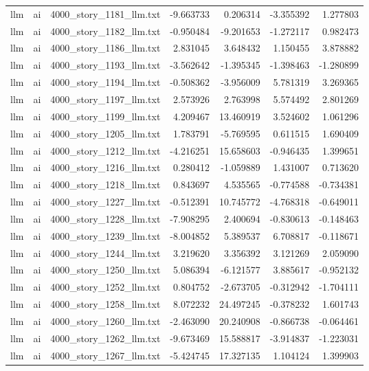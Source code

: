 \begin{longtable}{lllrrrr}
llm & ai & 4000\_story\_1181\_llm.txt & -9.663733 & 0.206314 & -3.355392 & 1.277803 \\
llm & ai & 4000\_story\_1182\_llm.txt & -0.950484 & -9.201653 & -1.272117 & 0.982473 \\
llm & ai & 4000\_story\_1186\_llm.txt & 2.831045 & 3.648432 & 1.150455 & 3.878882 \\
llm & ai & 4000\_story\_1193\_llm.txt & -3.562642 & -1.395345 & -1.398463 & -1.280899 \\
llm & ai & 4000\_story\_1194\_llm.txt & -0.508362 & -3.956009 & 5.781319 & 3.269365 \\
llm & ai & 4000\_story\_1197\_llm.txt & 2.573926 & 2.763998 & 5.574492 & 2.801269 \\
llm & ai & 4000\_story\_1199\_llm.txt & 4.209467 & 13.460919 & 3.524602 & 1.061296 \\
llm & ai & 4000\_story\_1205\_llm.txt & 1.783791 & -5.769595 & 0.611515 & 1.690409 \\
llm & ai & 4000\_story\_1212\_llm.txt & -4.216251 & 15.658603 & -0.946435 & 1.399651 \\
llm & ai & 4000\_story\_1216\_llm.txt & 0.280412 & -1.059889 & 1.431007 & 0.713620 \\
llm & ai & 4000\_story\_1218\_llm.txt & 0.843697 & 4.535565 & -0.774588 & -0.734381 \\
llm & ai & 4000\_story\_1227\_llm.txt & -0.512391 & 10.745772 & -4.768318 & -0.649011 \\
llm & ai & 4000\_story\_1228\_llm.txt & -7.908295 & 2.400694 & -0.830613 & -0.148463 \\
llm & ai & 4000\_story\_1239\_llm.txt & -8.004852 & 5.389537 & 6.708817 & -0.118671 \\
llm & ai & 4000\_story\_1244\_llm.txt & 3.219620 & 3.356392 & 3.121269 & 2.059090 \\
llm & ai & 4000\_story\_1250\_llm.txt & 5.086394 & -6.121577 & 3.885617 & -0.952132 \\
llm & ai & 4000\_story\_1252\_llm.txt & 0.804752 & -2.673705 & -0.312942 & -1.704111 \\
llm & ai & 4000\_story\_1258\_llm.txt & 8.072232 & 24.497245 & -0.378232 & 1.601743 \\
llm & ai & 4000\_story\_1260\_llm.txt & -2.463090 & 20.240908 & -0.866738 & -0.064461 \\
llm & ai & 4000\_story\_1262\_llm.txt & -9.673469 & 15.588817 & -3.914837 & -1.223031 \\
llm & ai & 4000\_story\_1267\_llm.txt & -5.424745 & 17.327135 & 1.104124 & 1.399903 \\

\end{longtable}
